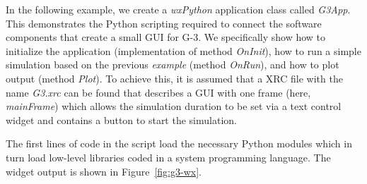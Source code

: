 \documentclass[10pt]{article}
\begin{document}
In the following example, we create a {\it wxPython} application class
called {\it G3App}. This demonstrates the Python scripting required to
connect the software components that create a small GUI for G-3.  We
specifically show how to initialize the application (implementation of
method {\it OnInit}), how to run a simple simulation based on the
previous {\it example} (method {\it OnRun}), and how to plot output
(method {\it Plot}).  To achieve this, it is assumed that a XRC file with the
name {\it G3.xrc} can be found that describes a GUI with one frame
(here, {\it mainFrame}) which allows the simulation duration to be set
via a text control widget and contains a button to start the simulation.

The first lines of code in the script load the necessary Python modules which in turn load low-level libraries coded in a system
programming language.  The widget output is shown in
Figure~\ref{fig:g3-wx}.  %
\end{document}
